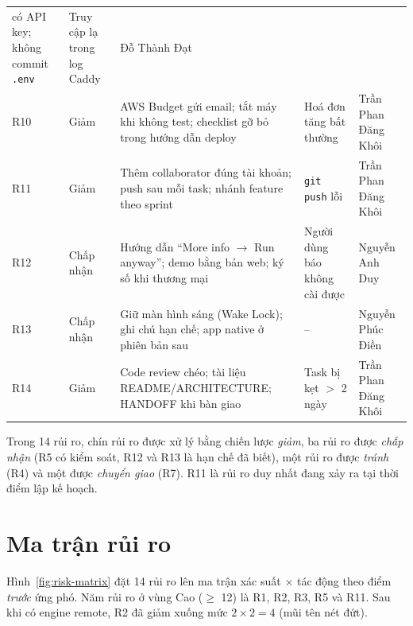 \documentclass[12pt,a4paper]{report}
\begin{document}
\begin{longtable}{@{}P{0.9cm}P{1.9cm}P{6.0cm}P{2.9cm}P{2.6cm}@{}}
        có API key; không commit \texttt{.env} & Truy cập lạ trong log Caddy & Đỗ Thành Đạt \\
  R10 & Giảm & AWS Budget gửi email; tắt máy khi không test; checklist gỡ bỏ trong hướng dẫn deploy
      & Hoá đơn tăng bất thường & Trần Phan Đăng Khôi \\
  R11 & Giảm & Thêm collaborator đúng tài khoản; push sau mỗi task; nhánh feature theo sprint
      & \texttt{git push} lỗi & Trần Phan Đăng Khôi \\
  R12 & Chấp nhận & Hướng dẫn ``More info $\rightarrow$ Run anyway''; demo bằng bản web; ký số khi thương mại
      & Người dùng báo không cài được & Nguyễn Anh Duy \\
  R13 & Chấp nhận & Giữ màn hình sáng (Wake Lock); ghi chú hạn chế; app native ở phiên bản sau & -- & Nguyễn Phúc Điền \\
  R14 & Giảm & Code review chéo; tài liệu README/ARCHITECTURE; HANDOFF khi bàn giao & Task bị kẹt $>$ 2 ngày
      & Trần Phan Đăng Khôi \\
\end{longtable}
\endgroup

Trong 14 rủi ro, chín rủi ro được xử lý bằng chiến lược \emph{giảm}, ba rủi ro được \emph{chấp nhận} (R5 có kiểm
soát, R12 và R13 là hạn chế đã biết), một rủi ro được \emph{tránh} (R4) và một được \emph{chuyển giao} (R7). R11 là
rủi ro duy nhất đang xảy ra tại thời điểm lập kế hoạch.

\section{Ma trận rủi ro}

Hình~\ref{fig:risk-matrix} đặt 14 rủi ro lên ma trận xác suất $\times$ tác động theo điểm \emph{trước} ứng phó.
Năm rủi ro ở vùng Cao ($\geq$ 12) là R1, R2, R3, R5 và R11. Sau khi có engine remote, R2 đã giảm xuống mức
$2 \times 2 = 4$ (mũi tên nét đứt).
\end{document}
